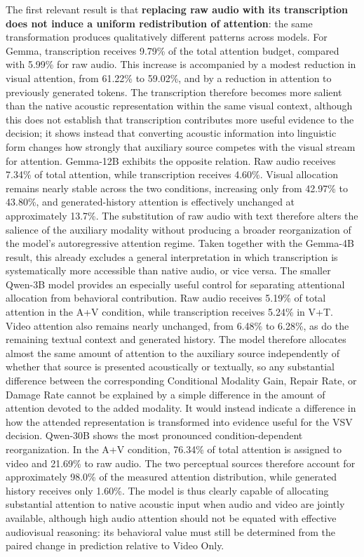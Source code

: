 The first relevant result is that \textbf{replacing raw audio with its transcription does not induce a uniform redistribution of attention}: the same transformation produces qualitatively different patterns across models. For Gemma, transcription receives 9.79\% of the total attention budget, compared with 5.99\% for raw audio. This increase is accompanied by a modest reduction in visual attention, from 61.22\% to 59.02\%, and by a reduction in attention to previously generated tokens. The transcription therefore becomes more salient than the native acoustic representation within the same visual context, although this does not establish that transcription contributes more useful evidence to the decision; it shows instead that converting acoustic information into linguistic form changes how strongly that auxiliary source competes with the visual stream for attention.
Gemma-12B exhibits the opposite relation. Raw audio receives 7.34\% of total attention, while transcription receives 4.60\%. Visual allocation remains nearly stable across the two conditions, increasing only from 42.97\% to 43.80\%, and generated-history attention is effectively unchanged at approximately 13.7\%. The substitution of raw audio with text therefore alters the salience of the auxiliary modality without producing a broader reorganization of the model's autoregressive attention regime. Taken together with the Gemma-4B    result, this already excludes a general interpretation in which transcription is systematically more accessible than native audio, or vice versa.
The smaller Qwen-3B model provides an especially useful control for separating attentional allocation from behavioral contribution. Raw audio receives 5.19\% of total attention in the A+V condition, while transcription receives 5.24\% in V+T. Video attention also remains nearly unchanged, from 6.48\% to 6.28\%, as do the remaining textual context and generated history. The model therefore allocates almost the same amount of attention to the auxiliary source independently of whether that source is presented acoustically or textually, so any substantial difference between the corresponding Conditional Modality Gain, Repair Rate, or Damage Rate cannot be explained by a simple difference in the amount of attention devoted to the added modality. It would instead indicate a difference in how the attended representation is transformed into evidence useful for the VSV decision.
Qwen-30B shows the most pronounced condition-dependent reorganization. In the A+V condition, 76.34\% of total attention is assigned to video and 21.69\% to raw audio. The two perceptual sources therefore account for approximately 98.0\% of the measured attention distribution, while generated history receives only 1.60\%. The model is thus clearly capable of allocating substantial attention to native acoustic input when audio and video are jointly available, although high audio attention should not be equated with effective audiovisual reasoning: its behavioral value must still be determined from the paired change in prediction relative to Video Only.
